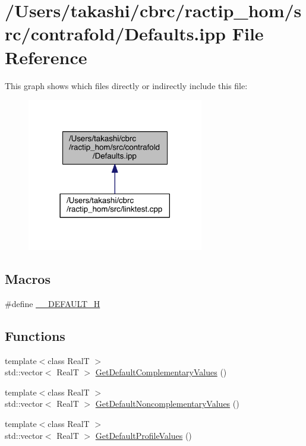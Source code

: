 \hypertarget{contrafold_2_defaults_8ipp}{\section{/\+Users/takashi/cbrc/ractip\+\_\+hom/src/contrafold/\+Defaults.ipp File Reference}
\label{contrafold_2_defaults_8ipp}
}
This graph shows which files directly or indirectly include this file\+:
\nopagebreak
\begin{figure}[H]
\begin{center}
\leavevmode
\includegraphics[width=218pt]{contrafold_2_defaults_8ipp__dep__incl}
\end{center}
\end{figure}
\subsection*{Macros}
\begin{DoxyCompactItemize}
\item 
\#define \hyperlink{contrafold_2_defaults_8ipp_a51c3d9779a92f7aeb0a4dd13564d7400}{\+\_\+\+\_\+\+D\+E\+F\+A\+U\+L\+T\+\_\+\+H}
\end{DoxyCompactItemize}
\subsection*{Functions}
\begin{DoxyCompactItemize}
\item 
{\footnotesize template$<$class Real\+T $>$ }\\std\+::vector$<$ Real\+T $>$ \hyperlink{contrafold_2_defaults_8ipp_afb5a440e88f64e6252d019b095e8846a}{Get\+Default\+Complementary\+Values} ()
\item 
{\footnotesize template$<$class Real\+T $>$ }\\std\+::vector$<$ Real\+T $>$ \hyperlink{contrafold_2_defaults_8ipp_a3a5415fe91bb146372175c7b5b690a55}{Get\+Default\+Noncomplementary\+Values} ()
\item 
{\footnotesize template$<$class Real\+T $>$ }\\std\+::vector$<$ Real\+T $>$ \hyperlink{contrafold_2_defaults_8ipp_ac546b0a743dfca80b923a6e37bc68509}{Get\+Default\+Profile\+Values} ()
\end{DoxyCompactItemize}


